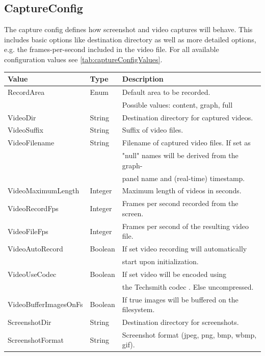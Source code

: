 \subsection{CaptureConfig}
\label{ss:captureConfig}
The capture config defines how screenshot and video captures will behave. This includes basic options like destination directory as well as more detailed options, e.g. the frames-per-second included in the video file. For all available configuration values see \ref{tab:captureConfigValues}.

\begin{table}[h]
\centering
\begin{tabular}[h]{|l|l|l|}\hline
	\textbf{Value} & \textbf{Type} & \textbf{Description}\\
	\hline
	RecordArea & Enum & Default area to be recorded.\\
	& & Possible values: content, graph, full\\
	\hline
	VideoDir & String & Destination directory for captured videos.\\
	\hline
	VideoSuffix & String & Suffix of video files.\\
	\hline
	VideoFilename & String & Filename of captured video files. If set as\\
	& & "null" names will be derived from the graph-\\
	& & panel name and (real-time) timestamp.\\
	\hline
	VideoMaximumLength & Integer & Maximum length of videos in seconds.\\
	\hline
	VideoRecordFps & Integer & Frames per second recorded from the screen.\\
	\hline
	VideoFileFps & Integer & Frames per second of the resulting video file.\\
	\hline
	VideoAutoRecord & Boolean & If set video recording will automatically\\
	& & start upon initialization.\\
	\hline
	VideoUseCodec & Boolean & If set video will be encoded using\\
	& & the Techsmith codec \cite{techsmith-codecs}. Else uncompressed.\\
	\hline
	VideoBufferImagesOnFs & Boolean & If true images will be buffered on the filesystem.\\
	\hline
	ScreenshotDir & String & Destination directory for screenshots.\\
	\hline
	ScreenshotFormat & String & Screenshot format (jpeg, png, bmp, wbmp, gif).\\

\end{tabular}
\end{table}
